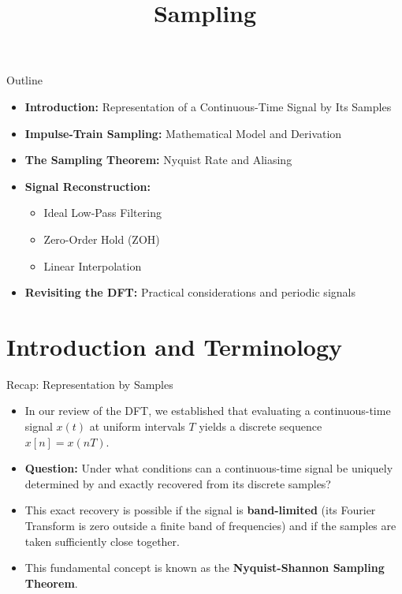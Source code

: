

\title{Sampling}



\maketitle

\begin{frame}{Outline}
  \begin{itemize}
    \item \textbf{Introduction:} Representation of a Continuous-Time Signal by Its Samples
    \item \textbf{Impulse-Train Sampling:} Mathematical Model and Derivation
    \item \textbf{The Sampling Theorem:} Nyquist Rate and Aliasing
    \item \textbf{Signal Reconstruction:}
      \begin{itemize}
        \item Ideal Low-Pass Filtering
        \item Zero-Order Hold (ZOH)
        \item Linear Interpolation
      \end{itemize}
    \item \textbf{Revisiting the DFT:} Practical considerations and periodic signals
  \end{itemize}
\end{frame}

\section{Introduction and Terminology}

\begin{frame}{Recap: Representation by Samples}
  \begin{itemize}
    \item In our review of the DFT, we established that evaluating a continuous-time signal $x(t)$ at uniform intervals $T$ yields a discrete sequence $x[n] = x(nT)$.
    \item \textbf{Question:} Under what conditions can a continuous-time signal be uniquely determined by and exactly recovered from its discrete samples?
    \item This exact recovery is possible if the signal is \textbf{band-limited} (its Fourier Transform is zero outside a finite band of frequencies) and if the samples are taken sufficiently close together.
    \item This fundamental concept is known as the \textbf{Nyquist-Shannon Sampling Theorem}.
  \end{itemize}
\end{frame}

